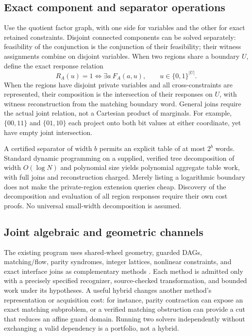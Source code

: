 \documentclass[11pt,letterpaper]{article}
\theoremstyle{definition}
\newcommand{\bits}{\{0,1\}}
\newcommand{\abs}[1]{\lvert#1\rvert}
\begin{document}
\subsection{Exact component and separator operations}
Use the quotient factor graph, with one side for variables and the other for exact retained constraints. Disjoint connected components can be solved separately: feasibility of the conjunction is the conjunction of their feasibility; their witness assignments combine on disjoint variables. When two regions share a boundary \(U\), define the exact response relation
\begin{equation}\label{eq:response}
 R_A(u)=1\iff \exists a\ F_A(a,u),\qquad u\in\bits^{\abs U}.
\end{equation}
When the regions have disjoint private variables and all cross-constraints are represented, their composition is the intersection of their responses on \(U\), with witness reconstruction from the matching boundary word. General joins require the actual joint relation, not a Cartesian product of marginals. For example, \(\{00,11\}\) and \(\{01,10\}\) each project onto both bit values at either coordinate, yet have empty joint intersection.

A certified separator of width \(b\) permits an explicit table of at most \(2^b\) words. Standard dynamic programming on a supplied, verified tree decomposition of width \(O(\log N)\) and polynomial size yields polynomial aggregate table work, with full joins and reconstruction charged. Merely listing a logarithmic boundary does not make the private-region extension queries cheap. Discovery of the decomposition and evaluation of all region responses require their own cost proofs. No universal small-width decomposition is assumed.

\subsection{Joint algebraic and geometric channels}
The existing program uses shared-wheel geometry, guarded DAGs, matching/flow, parity syndromes, integer lattices, nonlinear constraints, and exact interface joins as complementary methods \cite{ebdirective,tracks}. Each method is admitted only with a precisely specified recognizer, source-checked transformation, and bounded work under its hypotheses. A useful hybrid changes another method's representation or acquisition cost: for instance, parity contraction can expose an exact matching subproblem, or a verified matching obstruction can provide a cut that reduces an affine guard domain. Running two solvers independently without exchanging a valid dependency is a portfolio, not a hybrid.
\end{document}

